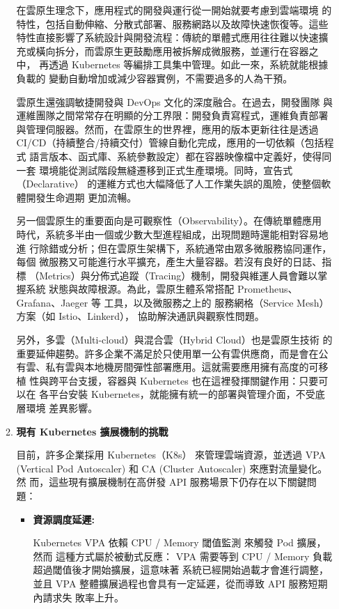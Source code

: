 \documentclass[12pt,a4paper]{article}
\begin{document}
\begin{enumerate}[label={(\zhdig*)}, leftmargin=2\parindent, listparindent=\parindent]
\begin{enumerate}[label={(\arabic*)}, leftmargin=\parindent, listparindent=\parindent]
在雲原生理念下，應用程式的開發與運行從一開始就要考慮到雲端環境
的特性，包括自動伸縮、分散式部署、服務網路以及故障快速恢復等。這些
特性直接影響了系統設計與開發流程：傳統的單體式應用往往難以快速擴
充或橫向拆分，而雲原生更鼓勵應用被拆解成微服務，並運行在容器之中，
再透過 Kubernetes 等編排工具集中管理。如此一來，系統就能根據負載的
變動自動增加或減少容器實例，不需要過多的人為干預。

雲原生還強調敏捷開發與 DevOps 文化的深度融合。在過去，開發團隊
與運維團隊之間常常存在明顯的分工界限：開發負責寫程式，運維負責部署
與管理伺服器。然而，在雲原生的世界裡，應用的版本更新往往是透過
CI/CD（持續整合/持續交付）管線自動化完成，應用的一切依賴（包括程式
語言版本、函式庫、系統參數設定）都在容器映像檔中定義好，使得同一套
環境能從測試階段無縫遷移到正式生產環境。同時，宣告式（Declarative）
的運維方式也大幅降低了人工作業失誤的風險，使整個軟體開發生命週期
更加流暢。

另一個雲原生的重要面向是可觀察性（Observability）。在傳統單體應用
時代，系統多半由一個或少數大型進程組成，出現問題時還能相對容易地進
行除錯或分析；但在雲原生架構下，系統通常由眾多微服務協同運作，每個
微服務又可能進行水平擴充，產生大量容器。若沒有良好的日誌、指標
（Metrics）與分佈式追蹤（Tracing）機制，開發與維運人員會難以掌握系統
狀態與故障根源。為此，雲原生體系常搭配 Prometheus、Grafana、Jaeger 等
工具，以及微服務之上的 服務網格（Service Mesh）方案（如 Istio、Linkerd），
協助解決通訊與觀察性問題。

另外，多雲（Multi-cloud）與混合雲（Hybrid Cloud）也是雲原生技術
的重要延伸趨勢。許多企業不滿足於只使用單一公有雲供應商，而是會在公
有雲、私有雲與本地機房間彈性部署應用。這就需要應用擁有高度的可移植
性與跨平台支援，容器與 Kubernetes 也在這裡發揮關鍵作用：只要可以在
各平台安裝 Kubernetes，就能擁有統一的部署與管理介面，不受底層環境
差異影響。

\item\textbf{現有 Kubernetes 擴展機制的挑戰}

目前，許多企業採用 Kubernetes（K8s） 來管理雲端資源，並透過 VPA
(Vertical Pod Autoscaler) 和 CA (Cluster Autoscaler) 來應對流量變化。然
而，這些現有擴展機制在高併發 API 服務場景下仍存在以下關鍵問題：
\begin{itemize}[leftmargin=\parindent, listparindent=\parindent]
    \item\textbf{資源調度延遲:}

Kubernetes VPA 依賴 CPU / Memory 閾值監測 來觸發 Pod 擴展，然而
這種方式屬於被動式反應：
VPA 需要等到 CPU / Memory 負載超過閾值後才開始擴展，這意味著
系統已經開始過載才會進行調整，並且 VPA 整體擴展過程也會具有一定延遲，從而導致 API 服務短期內請求失
敗率上升。


\end{itemize}
\end{enumerate}
\end{enumerate}
\end{document}
